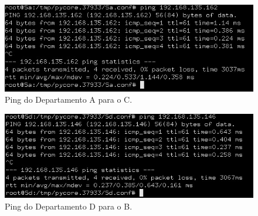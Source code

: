     \paragraph{}
    \begin{minipage}{0.5\linewidth}
    \centering
        \begin{figure}[H]
        \centering
        \includegraphics[width=\linewidth]{images/ParteII/Questao3/questao3-DepA-DepC-Sa-Sc.jpg}
        \caption{Ping do Departamento A para o C.} \label{parteII-questao3-ping-A-C}
        \end{figure}
    \end{minipage}
    \begin{minipage}{0.5\linewidth}
    \centering
        \begin{figure}[H]
        \centering
        \includegraphics[width=\linewidth]{images/ParteII/Questao3/questao3-Depd-DepB-Sd-Sb.jpg}
        \caption{Ping do Departamento D para o B.} \label{parteII-questao3-ping-D-B}
        \end{figure}
    \end{minipage}